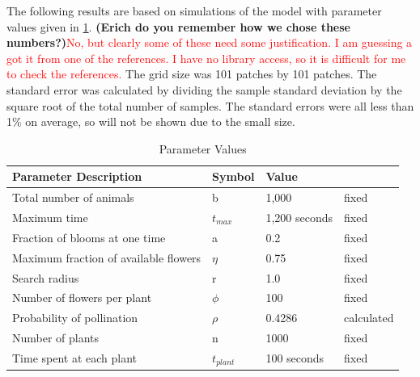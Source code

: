 The following results are based on simulations of the model with parameter
values given in \cref{tab:parameter}. {\bf (Erich do you remember how we chose
these numbers?)}\textcolor{red}{No, but clearly some of these need some
justification. I am guessing a got it from one of the references. I have no
library access, so it is difficult for me to check the references.} The grid
size was 101 patches by 101 patches.  The standard error was calculated by
dividing the sample standard deviation by the square root of the total number of
samples. The standard errors were all less than 1\% on average, so will not be
shown due to the small size.

\begin{table}
  \centering
  \begin{tabular}{|l|l|l|l|}
    \hline
    Parameter Description & Symbol & Value &  \\ \hline  \label{parameter}
    Total number of animals & b & 1,000 & fixed  \\ \hline
    Maximum time & $t_{max}$ & 1,200 seconds & fixed \\ \hline
    Fraction of blooms at one time & a & 0.2 & fixed \\ \hline
    Maximum fraction of available flowers & $\eta$ & 0.75 & fixed \\ \hline
    Search radius & r & 1.0 & fixed \\ \hline
    Number of flowers per plant & $\phi$ & 100 & fixed \\ \hline
    Probability of pollination   & $\rho$ & 0.4286 & calculated \\ \hline
    Number of plants & n & 1000 & fixed \\ \hline
    Time spent at each plant & $t_{plant}$ & 100 seconds & fixed \\ \hline
  \end{tabular}
  \caption{Parameter Values}
  \label{tab:parameter}
\end{table}

